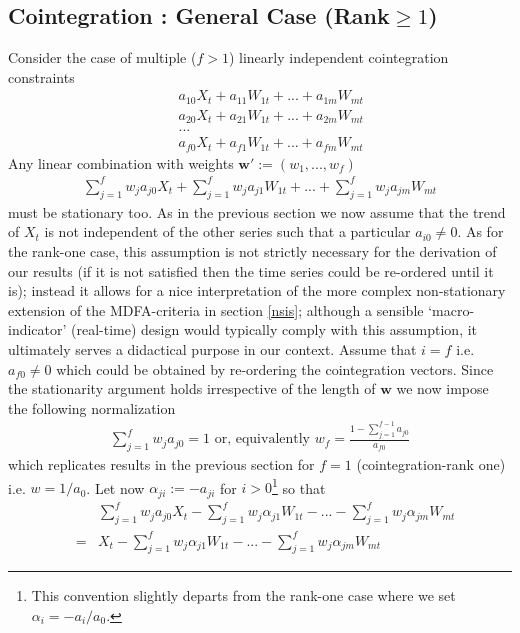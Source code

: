 \documentclass[11pt]{article}
\begin{document}
\subsection{Cointegration : General Case (Rank$\geq 1$)}\label{rankf}

Consider the case of multiple ($f>1$) linearly independent cointegration constraints 
\begin{eqnarray*}
&&a_{10}X_t+a_{11}W_{1t}+...+a_{1m}W_{mt}\\
&&a_{20}X_t+a_{21}W_{1t}+...+a_{2m}W_{mt}\\
&&...\\
&&a_{f0}X_t+a_{f1}W_{1t}+...+a_{fm}W_{mt}
\end{eqnarray*}
Any linear combination with weights $\mathbf{w}':=(w_1,...,w_f)$
\begin{eqnarray*}
\sum_{j=1}^fw_ja_{j0}X_t+\sum_{j=1}^fw_ja_{j1}W_{1t}+...+\sum_{j=1}^fw_ja_{jm}W_{mt}
\end{eqnarray*}
must be stationary too. As in the previous section we now assume that the trend of $X_t$ is not independent of the other series such that a particular $a_{i0}\not=0$. As for the rank-one case, this assumption is not strictly necessary for the derivation of our results (if it is not satisfied then the time series could be re-ordered until it is); instead it allows for a nice interpretation of the more complex non-stationary extension of the MDFA-criteria in section \ref{nsis}; although a sensible `macro-indicator' (real-time) design would typically comply with this assumption, it ultimately serves a didactical purpose in our context.  Assume that $i=f$ i.e. $a_{f0}\not= 0$ which could be obtained by re-ordering the cointegration vectors. Since the stationarity argument holds irrespective of the length of $\mathbf{w}$ we now impose the following normalization
\begin{eqnarray}\label{w_norm_c}
\sum_{j=1}^fw_ja_{j0}=1\textrm{~or,~equivalently~}w_f=\frac{1-\sum_{j=1}^{f-1}a_{j0}}{a_{f0}}
\end{eqnarray} 
which replicates results in the previous section for $f=1$ (cointegration-rank one) i.e. $w=1/a_0$. Let now $\alpha_{ji}:=-a_{ji}$ for $i>0$\footnote{This convention slightly departs from the rank-one case where we set $\alpha_i=-a_i/a_0$.} so that
\begin{eqnarray}\label{l_comb}
&&\sum_{j=1}^fw_ja_{j0}X_t-\sum_{j=1}^fw_j\alpha_{j1}W_{1t}-...-\sum_{j=1}^fw_j\alpha_{jm}W_{mt}\nonumber\\
&=&X_t-\sum_{j=1}^fw_j\alpha_{j1}W_{1t}-...-\sum_{j=1}^fw_j\alpha_{jm}W_{mt}
\end{eqnarray}
\end{document}
